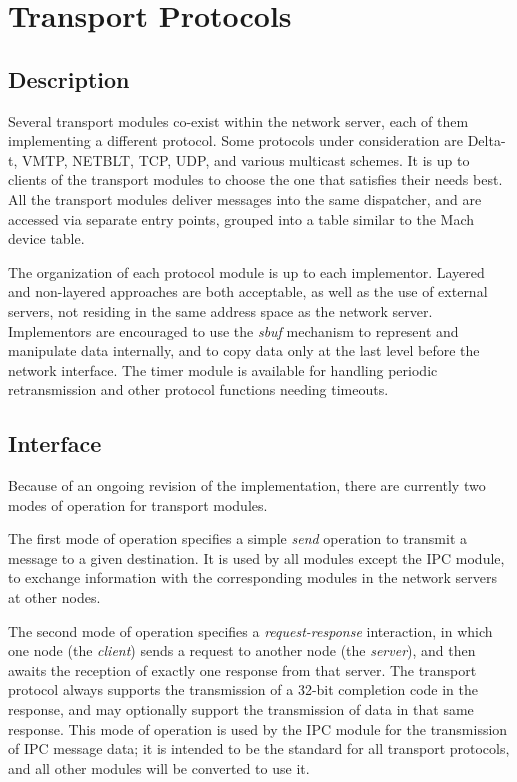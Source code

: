 \section{Transport Protocols}
\subsection{Description}
Several transport modules co-exist within the network server, each of them
implementing a different protocol.  Some protocols under consideration are
Delta-t, VMTP, NETBLT, TCP, UDP, and various multicast schemes.  It is up to
clients of the transport modules to choose the one that satisfies their
needs best.  All the transport modules deliver messages into the same
dispatcher, and are accessed via separate entry points, grouped into a table
similar to the Mach device table.

The organization of each protocol module is up to each implementor.  Layered
and non-layered approaches are both acceptable, as well as the use of
external servers, not residing in the same address space as the network
server.  Implementors are encouraged to use the {\it sbuf} mechanism to
represent and manipulate data internally, and to copy data only at the last
level before the network interface.  The timer module is available for
handling periodic retransmission and other protocol functions needing
timeouts.

\subsection{Interface}  \label{trint}
Because of an ongoing revision of the implementation, there are
currently two modes of operation for transport modules. 

The first mode of operation specifies a simple {\it send} operation to
transmit a message to a given destination. It is used by all modules
except the IPC module, to exchange information with the corresponding
modules in the network servers at other nodes.

The second mode of operation specifies a {\it request-response}
interaction, in which one node (the {\it client}) sends a request to
another node (the {\it server}), and then awaits the reception of
exactly one response from that server. The transport protocol always
supports the transmission of a 32-bit completion code in the response,
and may optionally support the transmission of data in that same
response. This mode of operation is used by the IPC module for the
transmission of IPC message data; it is intended to be the standard
for all transport protocols, and all other modules will be converted
to use it.

